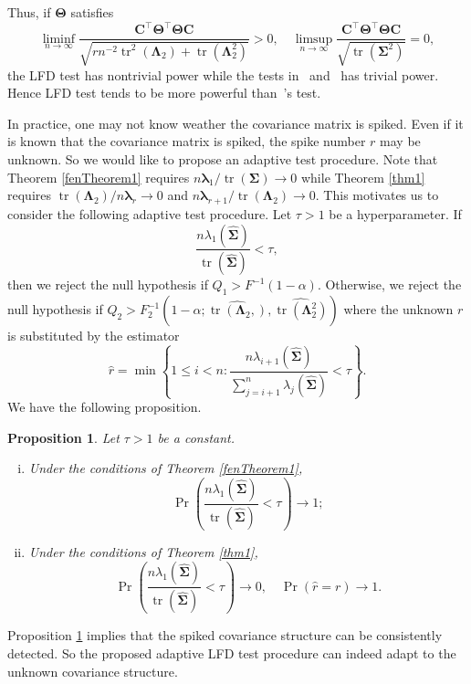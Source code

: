 \documentclass[12pt]{article} %
\DeclareMathOperator{\mytr}{tr}
\newcommand{\bC}{\mathbf{C}}
\newcommand{\bfsym}[1]{\ensuremath{\boldsymbol{#1}}}
\def\blambda {\bfsym {\lambda}}
\def\bLambda {\bfsym {\Lambda}}
\def\bSigma {\bfsym {\Sigma}}
\def\bTheta {\bfsym {\Theta}}
\newtheorem{proposition}{Proposition}
\theoremstyle{definition}
\begin{document}
Thus, if $\bTheta$ satisfies
\begin{equation*}
    \liminf_{n\to \infty}\frac{
    \bC^\top \bTheta^\top \bTheta \bC
}{
    \sqrt{
        rn^{-2} \mytr^2 (\bLambda_2) + \mytr(\bLambda_2^2)
    }
}
>0,
\quad
    \limsup_{n\to \infty}\frac{
    \bC^\top \bTheta^\top \bTheta \bC
}{
    \sqrt{
        \mytr(\bSigma^2)
    }
}
=0,
\end{equation*}
the LFD test has nontrivial power while  the tests in~\cite{Bai1996Efiect} and~\cite{Chen2010A} has trivial power.
Hence LFD test tends to be more powerful than~\cite{Chen2010A}'s test.


In practice, one may not know weather the covariance matrix is spiked. Even if it is known that the covariance matrix is spiked, the spike number $r$ may be unknown.
So we would like to propose an adaptive test procedure.
Note that Theorem \ref{fenTheorem1} requires $n\blambda_1/\mytr(\bSigma)\to 0$ while Theorem \ref{thm1} requires $\mytr(\bLambda_2)/n\blambda_r\to 0$ and $n\blambda_{r+1}/\mytr(\bLambda_2)\to 0$.
This motivates us to consider the following adaptive test procedure.
Let $\tau>1$ be a hyperparameter.
If
\begin{equation*}
    \frac{
        n\lambda_1(\hat{\bSigma})
    }{
\mytr(\hat{\bSigma})}
<\tau,
\end{equation*}
then we reject the null hypothesis if $Q_1 > F^{-1}(1-\alpha)$.
Otherwise, we reject the null hypothesis if $Q_2> F_2^{-1}(1-\alpha;\widehat{\mytr(\bLambda_2,)},\widehat{\mytr(\bLambda_2^2)})$ where the unknown $r$ is substituted by the estimator
\begin{equation*}
    \hat{r}=\min
    \left\{
1\leq i< n:
    \frac{
        n\lambda_{i+1}(\hat{\bSigma})
}
{    
    \sum_{j=i+1}^n
\lambda_j(\hat{\bSigma})}
<
\tau
\right\}
.
\end{equation*}
We have the following proposition.
\begin{proposition}\label{numberConsistency}
    Let $\tau>1$ be a constant.
    \begin{enumerate}[(i)]
        \item 
    Under the conditions of Theorem \ref{fenTheorem1}, 
    \begin{equation*}
        \Pr\left(
    \frac{
        n\lambda_1(\hat{\bSigma})
    }{
    \mytr(\hat{\bSigma})}
<\tau
\right)\to 1
;
    \end{equation*}
\item
    Under the conditions of Theorem \ref{thm1},
    \begin{equation*}
        \Pr\left(
    \frac{
        n\lambda_1(\hat{\bSigma})
    }{
    \mytr(\hat{\bSigma})}
<\tau
\right)\to 0,\quad
\Pr(\hat{r}= r)\to 1
.
    \end{equation*}
    \end{enumerate}
\end{proposition}
Proposition \ref{numberConsistency} implies that the spiked covariance structure can be consistently detected.
So the proposed adaptive LFD test procedure can indeed adapt to the unknown covariance structure.
\end{document}
